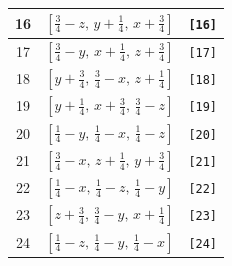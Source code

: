 \documentclass[fleqn,8pt]{jsarticle}
\begin{document}
\begin{longtable}{ccc}
16 & $\left[ \frac{3}{4} - z,\, y + \frac{1}{4},\, x + \frac{3}{4} \right]$ & {\tt [16]} \\ \hline
17 & $\left[ \frac{3}{4} - y,\, x + \frac{1}{4},\, z + \frac{3}{4} \right]$ & {\tt [17]} \\ \hline
18 & $\left[ y + \frac{3}{4},\, \frac{3}{4} - x,\, z + \frac{1}{4} \right]$ & {\tt [18]} \\ \hline
19 & $\left[ y + \frac{1}{4},\, x + \frac{3}{4},\, \frac{3}{4} - z \right]$ & {\tt [19]} \\ \hline
20 & $\left[ \frac{1}{4} - y,\, \frac{1}{4} - x,\, \frac{1}{4} - z \right]$ & {\tt [20]} \\ \hline
21 & $\left[ \frac{3}{4} - x,\, z + \frac{1}{4},\, y + \frac{3}{4} \right]$ & {\tt [21]} \\ \hline
22 & $\left[ \frac{1}{4} - x,\, \frac{1}{4} - z,\, \frac{1}{4} - y \right]$ & {\tt [22]} \\ \hline
23 & $\left[ z + \frac{3}{4},\, \frac{3}{4} - y,\, x + \frac{1}{4} \right]$ & {\tt [23]} \\ \hline
24 & $\left[ \frac{1}{4} - z,\, \frac{1}{4} - y,\, \frac{1}{4} - x \right]$ & {\tt [24]} \\
\end{longtable}
\end{document}
